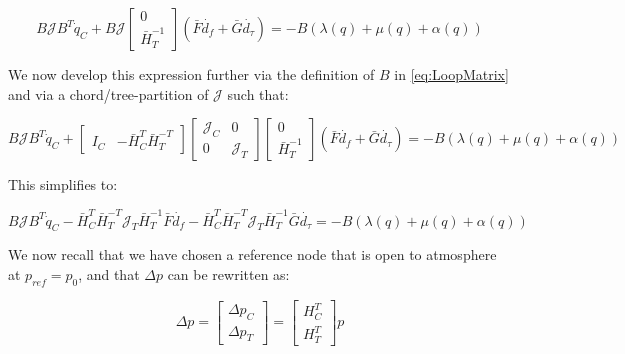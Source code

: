 \begin{equation}\label{eq:PressureFunctionKirchKNL}
	B\mathcal{J}B^T\dot{q}_C + B \mathcal{J} 
	\begin{bmatrix} 0 \\ \bar{H}_T^{-1} \end{bmatrix} (\bar{F} \dot{d_f} + \bar{G} \dot{d_{\tau}})
	= -B(\lambda(q) + \mu(q) + \alpha(q))
\end{equation}

We now develop this expression further via the definition of $B$ in \cref{eq:LoopMatrix} and via a chord/tree-partition of $\mathcal{J}$ such that:

\begin{equation}\label{eq:PressureFunctionKirchJPartitions}
	B\mathcal{J}B^T\dot{q}_C + 
	\begin{bmatrix}		I_C & -\bar{H}_C^T\bar{H}_T^{-T}	\end{bmatrix} 
	\begin{bmatrix}		\mathcal{J}_C & 0 \\ 0 & \mathcal{J}_T	\end{bmatrix} 
	\begin{bmatrix} 0 \\ \bar{H}_T^{-1} \end{bmatrix}  (\bar{F}  \dot{d_f} + \bar{G}  \dot{d_{\tau}})
	= -B(\lambda(q) + \mu(q) + \alpha(q))
\end{equation}

This simplifies to:

\begin{equation}\label{eq:PressureFunctionKirchJPartitionsSimp} %
	B\mathcal{J}B^T\dot{q}_C 
	-\bar{H}_C^T\bar{H}_T^{-T}\mathcal{J}_T\bar{H}_T^{-1} \bar{F} \dot{d_f} 
	-\bar{H}_C^T\bar{H}_T^{-T}\mathcal{J}_T\bar{H}_T^{-1} \bar{G} \dot{d_{\tau}}
	= -B(\lambda(q) + \mu(q) + \alpha(q))
\end{equation}

We now recall that we have chosen a reference node that is open to atmosphere at $p_{ref} = p_0$, and that $\Delta p$ can be rewritten as: 

\begin{equation}\label{eq:DeltaPPartition}
	\Delta p =
	\begin{bmatrix}		\Delta p_C \\ \Delta p_T	\end{bmatrix} = 
	\begin{bmatrix}		H_C^T \\ H_T^T	\end{bmatrix} p
\end{equation}

